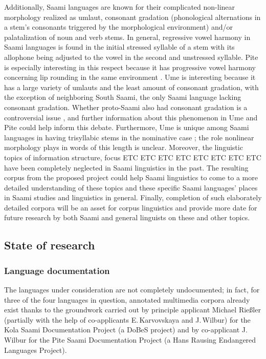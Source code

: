 \documentclass[a4paper,12pt]{article}
\begin{document}
Additionally, Saami languages are known for their complicated non-linear morphology realized as umlaut, consonant gradation (phonological alternations in a stem's consonants triggered by the morphological environment) and/or palatalization of noun and verb stems. In general, regressive vowel harmony in Saami languages is found in the initial stressed syllable of a stem with its allophone being adjusted to the vowel in the second and unstressed syllable. Pite is especially interesting in this respect because it has progressive vowel harmony concerning lip rounding in the same environment \cite[272]{korhonen2005a}. Ume is interesting because it has a large variety of umlauts and the least amount of consonant gradation, with the exception of neighboring South Saami, the only Saami language lacking consonant gradation. Whether proto-Saami also had consonant gradation is a controversial issue \cite[cf.][154–55]{svonni2006}, and further information about this phenomenon in Ume and Pite could help inform this debate. Furthermore, Ume is unique among Saami languages in having trisyllabic stems in the nominative case \cite[421]{korhonen2005b}; the role nonlinear morphology plays in words of this length is unclear. Moreover, the linguistic topics of information structure, focus ETC ETC ETC ETC ETC ETC ETC ETC have been completely neglected in Saami linguistics in the past.
The resulting corpus from the proposed project could help Saami linguistics to come to a more detailed understanding of %
these topics and these specific Saami languages' places in Saami studies and linguistics in general. Finally, completion of such elaborately detailed corpora will be an asset for corpus linguistics and provide more date for future research by both Saami and general linguists on these and other topics.

\subsection{State of research}%
\subsubsection{Language documentation}
The languages under consideration are not completely undocumented; in fact, for three of the four languages in question, annotated multimedia corpora already exist thanks to the groundwork carried out by principle applicant Michael Rießler (partially with the help of co-applicants E.\,Karvovskaya and J.\,Wilbur) for the Kola Saami Documentation Project (a DoBeS project) and by co-applicant J.\,Wilbur for the Pite Saami Documentation Project (a Hans Rausing Endangered Languages Project). %
\end{document}

